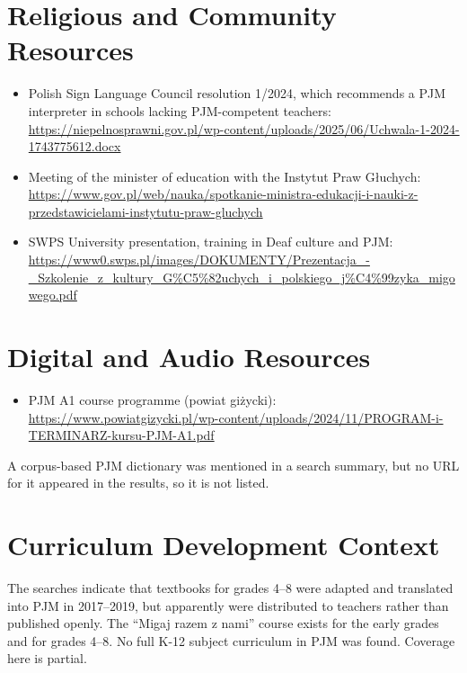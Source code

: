 \documentclass[12pt]{article}
\begin{document}
\section{Religious and Community Resources}
\begin{itemize}
\item Polish Sign Language Council resolution 1/2024, which recommends a PJM interpreter in schools lacking PJM-competent teachers: \url{https://niepelnosprawni.gov.pl/wp-content/uploads/2025/06/Uchwala-1-2024-1743775612.docx}
\item Meeting of the minister of education with the Instytut Praw G\l uchych: \url{https://www.gov.pl/web/nauka/spotkanie-ministra-edukacji-i-nauki-z-przedstawicielami-instytutu-praw-gluchych}
\item SWPS University presentation, training in Deaf culture and PJM: \url{https://www0.swps.pl/images/DOKUMENTY/Prezentacja_-_Szkolenie_z_kultury_G%C5%82uchych_i_polskiego_j%C4%99zyka_migowego.pdf}
\end{itemize}

\section{Digital and Audio Resources}
\begin{itemize}
\item PJM A1 course programme (powiat gi\.zycki): \url{https://www.powiatgizycki.pl/wp-content/uploads/2024/11/PROGRAM-i-TERMINARZ-kursu-PJM-A1.pdf}
\end{itemize}
A corpus-based PJM dictionary was mentioned in a search summary, but no URL for it appeared in the results, so it is not listed.

\section{Curriculum Development Context}
The searches indicate that textbooks for grades 4--8 were adapted and translated into PJM in 2017--2019, but apparently were distributed to teachers rather than published openly. The ``Migaj razem z nami'' course exists for the early grades and for grades 4--8. No full K-12 subject curriculum in PJM was found. Coverage here is partial.
\end{document}

